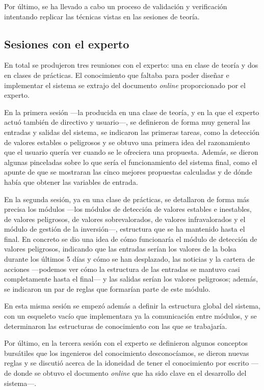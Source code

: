\documentclass[a4paper, 11pt, titlepage]{article}
\begin{document}
    Por último, se ha llevado a cabo un proceso de validación y verificación intentando replicar las técnicas vistas en las sesiones de teoría.

    \subsection{Sesiones con el experto}

    En total se produjeron tres reuniones con el experto: una en clase de teoría y dos en clases de prácticas. El conocimiento que faltaba para poder diseñar e implementar el sistema se extrajo del documento \emph{online} proporcionado por el experto.

    En la primera sesión ---la producida en una clase de teoría, y en la que el experto actuó también de directivo y usuario---, se definieron de forma muy general las entradas y salidas del sistema, se indicaron las primeras tareas, como la detección de valores estables o peligrosos y se obtuvo una primera idea del razonamiento que el usuario quería ver cuando se le ofreciera una propuesta. Además, se dieron algunas pinceladas sobre lo que sería el funcionamiento del sistema final, como el apunte de que se mostraran las cinco mejores propuestas calculadas y de dónde había que obtener las variables de entrada.

    En la segunda sesión, ya en una clase de prácticas, se detallaron de forma más precisa los módulos ---los módulos de detección de valores estables e inestables, de valores peligrosos, de valores sobrevalorados, de valores infravalorados y el módulo de gestión de la inversión---, estructura que se ha mantenido hasta el final. En concreto se dio una idea de cómo funcionaría el módulo de detección de valores peligrosos, indicando que las entradas serían los valores de la bolsa durante los últimos 5 días y cómo se han desplazado, las noticias y la cartera de acciones ---podemos ver cómo la estructura de las entradas se mantuvo casi completamente hasta el final--- y las salidas serían los valores peligrosos; además, se indicaron un par de reglas que formarían parte de este módulo.

    En esta misma sesión se empezó además a definir la estructura global del sistema, con un esqueleto vacío que implementara ya la comunicación entre módulos, y se determinaron las estructuras de conocimiento con las que se trabajaría.

    Por último, en la tercera sesión con el experto se definieron algunos conceptos bursátiles que los ingenieros del conocimiento desconocíamos, se dieron nuevas reglas y se discutió acerca de la idoneidad de tener el conocimiento por escrito ---de donde se obtuvo el documento \emph{online} que ha sido clave en el desarrollo del sistema---.
\end{document}
